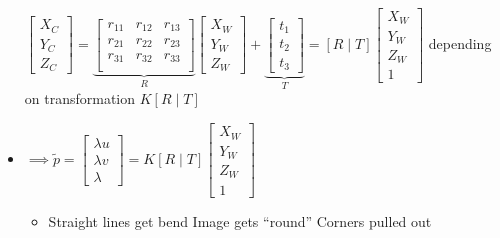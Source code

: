 \begin{itemize}
        $\begin{bmatrix}
            X_C\\
            Y_C\\
            Z_C
        \end{bmatrix}=
        \underbrace{
        \begin{bmatrix}
            r_{11}  & r_{12} & r_{13}\\
            r_{21}  & r_{22} & r_{23}\\
            r_{31}  & r_{32} & r_{33}\\
        \end{bmatrix}}_{R}
        \begin{bmatrix}
        X_W\\
        Y_W\\
        Z_W
        \end{bmatrix} +
        \underbrace{
        \begin{bmatrix}
            t_1\\
            t_2\\
            t_3
        \end{bmatrix}}_{T} = [R \mid T]
        \begin{bmatrix}
            X_W\\
            Y_W\\
            Z_W\\
            1
        \end{bmatrix}$
     depending on transformation
     $K[R \mid T]$
    \item $\implies \tilde p =
        \begin{bmatrix}
            \lambda u\\
            \lambda v\\
            \lambda
        \end{bmatrix} = K[R \mid T]
        \begin{bmatrix}
            X_W\\
            Y_W\\
            Z_W\\
            1
        \end{bmatrix}$
        \begin{itemize}
            \item Straight lines get bend
             Image gets ``round''
             Corners pulled out

\end{itemize}
\end{itemize}
